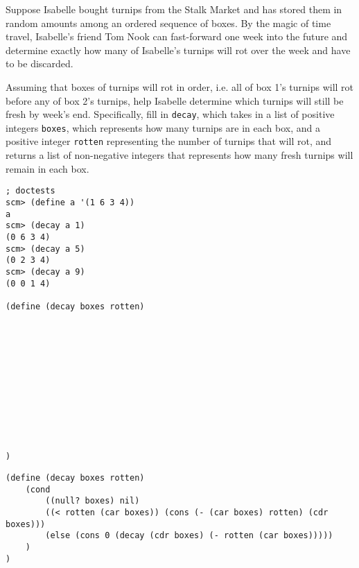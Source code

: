 \begin{blocksection}
\question
Suppose Isabelle bought turnips from the Stalk Market and has stored them in random amounts among an ordered sequence of boxes. By the magic of time travel, Isabelle's friend Tom Nook can fast-forward one week into the future and determine exactly how many of Isabelle's turnips will rot over the week and have to be discarded.

Assuming that boxes of turnips will rot in order, i.e. all of box 1's turnips will rot before any of box 2's turnips, help Isabelle determine which turnips will still be fresh by week's end. Specifically, fill in \lstinline{decay}, which takes in a list of positive integers \lstinline{boxes}, which represents how many turnips are in each box, and a positive integer \lstinline{rotten} representing the number of turnips that will rot, and returns a list of non-negative integers that represents how many fresh turnips will remain in each box.

\begin{lstlisting}
; doctests
scm> (define a '(1 6 3 4))
a
scm> (decay a 1)
(0 6 3 4)
scm> (decay a 5)
(0 2 3 4)
scm> (decay a 9)
(0 0 1 4)

(define (decay boxes rotten)












)
\end{lstlisting}
\end{blocksection}

\begin{blocksection}
\begin{solution}
\begin{lstlisting}
(define (decay boxes rotten)
    (cond 
        ((null? boxes) nil)
        ((< rotten (car boxes)) (cons (- (car boxes) rotten) (cdr boxes)))
        (else (cons 0 (decay (cdr boxes) (- rotten (car boxes)))))
    )
)
\end{lstlisting}
\end{solution}
\end{blocksection}

